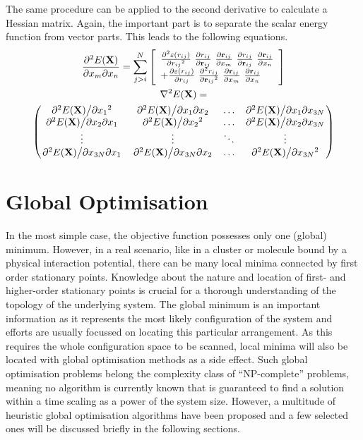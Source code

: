 The same procedure can be applied to the second derivative to calculate a
Hessian matrix. Again, the important part is to separate the scalar energy
function from vector parts. This leads to the following equations.
%
\begin{gather}
    \pdv{E(\mathbf{X})}{x_m}{x_n}=\sum_{j>i}^N\left[  
    \begin{array}{ll}
    \pdv[2]{\varepsilon(r_{ij})}{{r_{ij}}}\  
    \pdv{r_{ij}}{\mathbf{r}_{ij}}\ 
    \pdv{\mathbf{r}_{ij}}{x_m}\ 
    \pdv{r_{ij}}{\mathbf{r}_{ij}}\ 
    \pdv{\mathbf{r}_{ij}}{x_n} \\ 
    +
    \pdv{\varepsilon(r_{ij})}{r_{ij}}\
        \pdv[2]{r_{ij}}{{\mathbf{r}_{ij}}}\ 
    \pdv{\mathbf{r}_{ij}}{x_m}\ 
    \pdv{\mathbf{r}_{ij}}{x_n} 
    \end{array}
    \right]\\
    \begin{gathered}
    \nabla^2 E(\mathbf{X})=\\
    \begin{pmatrix}
        \pdv*[2]{E(\mathbf{X})}{{x_1}} & \pdv*{E(\mathbf{X})}{x_1}{x_2} & \ldots & \pdv*{E(\mathbf{X})}{x_1}{x_{3N}}\\
        \pdv*{E(\mathbf{X})}{x_2}{x_1} & \pdv*[2]{E(\mathbf{X})}{{x_2}} & \ldots & \pdv*{E(\mathbf{X})}{x_2}{x_{3N}}\\
        \vdots & \vdots & \ddots & \vdots\\
        \pdv*{E(\mathbf{X})}{x_{3N}}{x_1} & \pdv*{E(\mathbf{X})}{x_{3N}}{x_2} & \ldots & \pdv*[2]{E(\mathbf{X})}{{x_{3N}}}
    \end{pmatrix}
    \end{gathered}
\end{gather}

\section{Global Optimisation}
\label{sec:GlobalOptimisation}

In the most simple case, the objective function possesses only one (global)
minimum. However, in a real scenario, like in a cluster or molecule bound by a
physical interaction potential, there can be many local minima connected by
first order stationary points. Knowledge about the nature and location of first-
and higher-order stationary points is crucial for a thorough understanding of
the topology of the underlying system. The global minimum is an important
information as it represents the most likely configuration of the system and
efforts are usually focussed on locating this particular arrangement. As this
requires the whole configuration space to be scanned, local minima will also be
located with global optimisation methods as a side effect. Such global
optimisation problems belong the complexity class of ``NP-complete''
problems, meaning no algorithm is currently known that is guaranteed to find a
solution within a time scaling as a power of the system size. However, a
multitude of heuristic global optimisation algorithms have been proposed and a
few selected ones will be discussed briefly in the following sections.

